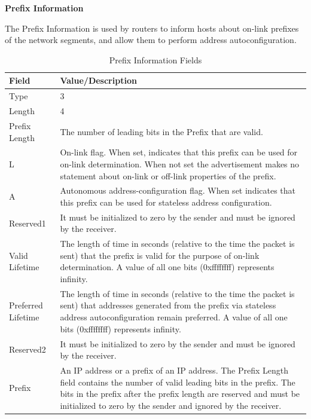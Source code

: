 \documentclass[12pt]{article}
\begin{document}
\textbf{Prefix Information}

The Prefix Information is used by routers to inform hosts about on-link prefixes of the network segments, and allow them to perform address autoconfiguration.

\begin{savenotes}
\begin{table}[!htpb]
\centering
\addtolength{\tabcolsep}{3pt}
\begin{tabular}{|L{3.0cm}|L{12.0cm}|}
\hline
Field&Value/Description\\
\hline
Type&3\\
\hline
Length&4\\
\hline
Prefix Length&The number of leading bits in the Prefix that are valid.\\
\hline
L&On-link flag. When set, indicates that this prefix can be used for on-link determination. When not set the advertisement makes no statement about on-link or off-link properties of the prefix.\\
\hline
A&Autonomous address-configuration flag. When set indicates that this prefix can be used for stateless address configuration.\\
\hline
Reserved1&It must be initialized to zero by the sender and must be ignored by the receiver.\\
\hline
Valid Lifetime&The length of time in seconds (relative to the time the packet is sent) that the prefix is valid for the purpose of on-link determination. A value of all one bits (0xffffffff) represents infinity.\\
\hline
Preferred Lifetime&The length of time in seconds (relative to the time the packet is sent) that addresses generated from the prefix via stateless address autoconfiguration remain preferred. A value of all one bits (0xffffffff) represents infinity.\\
\hline
Reserved2&It must be initialized to zero by the sender and must be ignored by the receiver.\\
\hline
Prefix&An IP address or a prefix of an IP address. The Prefix Length field contains the number of valid leading bits in the prefix. The bits in the prefix after the prefix length are reserved and must be initialized to zero by the sender and ignored by the receiver.\\
\hline
\end{tabular}
\caption{Prefix Information Fields}
\label{table:prefixInfo}
\end{table}
\end{savenotes}
\end{document}
